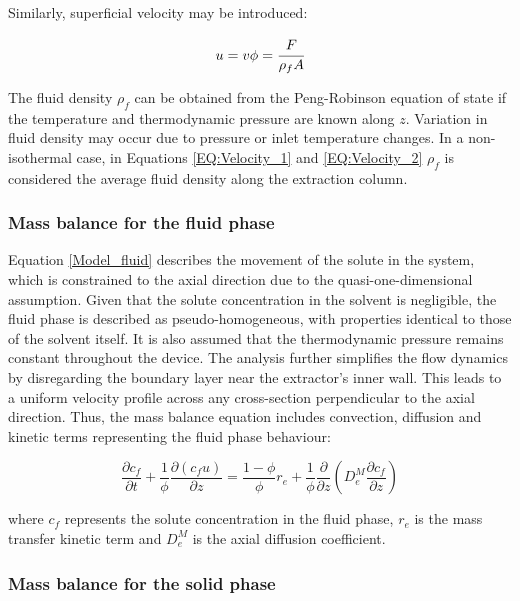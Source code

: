 \documentclass[../Article_Model_Parameters.tex]{subfiles}
\begin{document}
	Similarly, superficial velocity may be introduced:
	
	{\footnotesize
		\begin{equation} \label{EQ:Velocity_2}
			u = v \phi = \cfrac{F}{\rho_f A }
		\end{equation}
	}
	
	The fluid density $\rho_f$ can be obtained from the Peng-Robinson equation of state if the temperature and thermodynamic pressure are known along $z$. Variation in fluid density may occur due to pressure or inlet temperature changes. In a non-isothermal case, in Equations \ref{EQ:Velocity_1} and \ref{EQ:Velocity_2} $\rho_f$ is considered the average fluid density along the extraction column.
	
	\subsubsection{Mass balance for the fluid phase} \label{CH: Mass_balance_fluid}
	
	Equation \ref{Model_fluid} describes the movement of the solute in the system, which is constrained to the axial direction due to the quasi-one-dimensional assumption. Given that the solute concentration in the solvent is negligible, the fluid phase is described as pseudo-homogeneous, with properties identical to those of the solvent itself. It is also assumed that the thermodynamic pressure remains constant throughout the device. The analysis further simplifies the flow dynamics by disregarding the boundary layer near the extractor's inner wall. This leads to a uniform velocity profile across any cross-section perpendicular to the axial direction. Thus, the mass balance equation includes convection, diffusion and kinetic terms representing the fluid phase behaviour:
	
	{\footnotesize
		\begin{equation}
			\label{Model_fluid}
			\frac{\partial c_f}{\partial t}
			+ \frac{1}{\phi} \frac{\partial \left( c_f u\right)}{\partial z}
			= \frac{1-\phi}{\phi} r_e
			+ \frac{1}{\phi} \frac{\partial}{\partial z} \left( D^M_e \frac{\partial c_f}{\partial z} \right)
		\end{equation}
	}
	
	where $c_f$ represents the solute concentration in the fluid phase, $r_e$ is the mass transfer kinetic term and $D^M_e$ is the axial diffusion coefficient.
	
	\subsubsection{Mass balance for the solid phase} \label{Mass_balance_solid}
	
\end{document}
